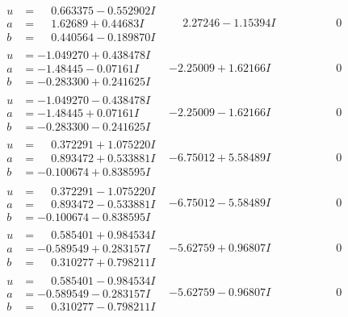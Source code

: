 \documentclass[1p]{elsarticle_modified}
\theoremstyle{definition}
\begin{document}
$$\begin{array}{c|c|c}
\begin{aligned}
u &= \phantom{-}0.663375 - 0.552902 I \\
a &= \phantom{-}1.62689 + 0.44683 I \\
b &= \phantom{-}0.440564 - 0.189870 I\end{aligned}
 & \phantom{-}2.27246 - 1.15394 I & \phantom{-0.000000 } 0 \\ \hline\begin{aligned}
u &= -1.049270 + 0.438478 I \\
a &= -1.48445 - 0.07161 I \\
b &= -0.283300 + 0.241625 I\end{aligned}
 & -2.25009 + 1.62166 I & \phantom{-0.000000 } 0 \\ \hline\begin{aligned}
u &= -1.049270 - 0.438478 I \\
a &= -1.48445 + 0.07161 I \\
b &= -0.283300 - 0.241625 I\end{aligned}
 & -2.25009 - 1.62166 I & \phantom{-0.000000 } 0 \\ \hline\begin{aligned}
u &= \phantom{-}0.372291 + 1.075220 I \\
a &= \phantom{-}0.893472 + 0.533881 I \\
b &= -0.100674 + 0.838595 I\end{aligned}
 & -6.75012 + 5.58489 I & \phantom{-0.000000 } 0 \\ \hline\begin{aligned}
u &= \phantom{-}0.372291 - 1.075220 I \\
a &= \phantom{-}0.893472 - 0.533881 I \\
b &= -0.100674 - 0.838595 I\end{aligned}
 & -6.75012 - 5.58489 I & \phantom{-0.000000 } 0 \\ \hline\begin{aligned}
u &= \phantom{-}0.585401 + 0.984534 I \\
a &= -0.589549 + 0.283157 I \\
b &= \phantom{-}0.310277 + 0.798211 I\end{aligned}
 & -5.62759 + 0.96807 I & \phantom{-0.000000 } 0 \\ \hline\begin{aligned}
u &= \phantom{-}0.585401 - 0.984534 I \\
a &= -0.589549 - 0.283157 I \\
b &= \phantom{-}0.310277 - 0.798211 I\end{aligned}
 & -5.62759 - 0.96807 I & \phantom{-0.000000 } 0 \\ \hline\begin{aligned}

\end{aligned}
\end{array}$$
\end{document}
